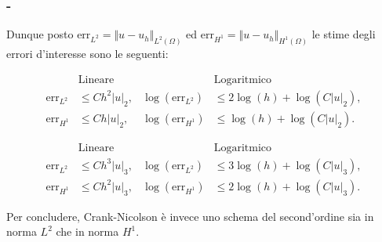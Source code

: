 \documentclass[11pt]{beamer}
\newcommand{\SpaziaturaMate}[3]{
    \setlength{\thinmuskip}{#1mu}
    \setlength{\medmuskip}{#2mu}
    \setlength{\thickmuskip}{#3mu}
}
\begin{document}
            \begin{frame}\frametitle{\insertpart{} - \insertsection{}}
                \SpaziaturaMate{1}{2}{3}
                Dunque posto $\text{err}_{L^2}=\Vert u-u_h\Vert_{L^2(\Omega)}$ ed $\text{err}_{H^1}=\Vert u-u_h\Vert_{H^1(\Omega)}$ le stime degli errori d'interesse sono le seguenti:

                \begin{description}[itemsep=0pt,       %
                                    leftmargin=0pt,       %
                                    labelindent=0.5cm] %
                
                    \item[Errore dei $\mathbb{P}_1$]%
                        \begin{align*}
                            &\text{Lineare}&&\text{Logaritmico}\tag*{}\\
                            \text{err}_{L^2}&\le Ch^2\vert u\vert_2,&
                            \log(\text{err}_{L^2})&\le 2\log(h)+\log(C\vert u\vert_2),
                            \\
                            \text{err}_{H^1}&\le Ch\vert u\vert_2,&
                            \log(\text{err}_{H^1})&\le \log(h)+\log(C\vert u\vert_2).
                        \end{align*}
                        
                    \item[Errore dei $\mathbb{P}_2$]%
                        \begin{align*}
                            &\text{Lineare}&&\text{Logaritmico}\tag*{}\\
                            \text{err}_{L^2}&\le Ch^3\vert u\vert_3,&
                            \log(\text{err}_{L^2})&\le 3\log(h)+\log(C\vert u\vert_3),
                            \\
                            \text{err}_{H^1}&\le Ch^2\vert u\vert_3,&
                            \log(\text{err}_{H^1})&\le 2\log(h)+\log(C\vert u\vert_3).
                        \end{align*}
    
                \end{description}    

                Per concludere, Crank-Nicolson è invece uno schema del second'ordine sia in norma $L^2$ che in norma $H^1$.
            \end{frame}
\end{document}
